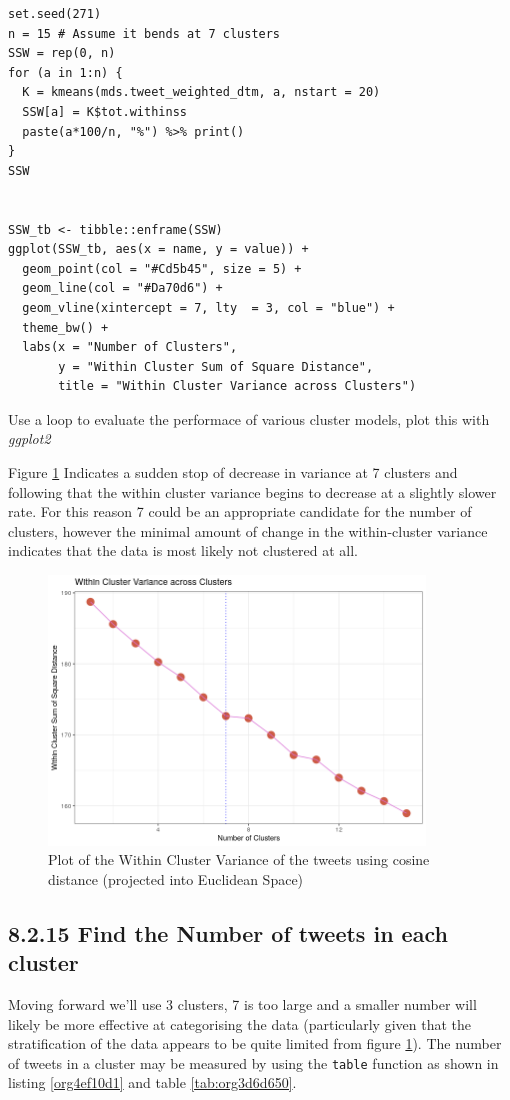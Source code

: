\documentclass[11pt]{article}
\begin{document}
\begin{listing}[htbp]
\begin{verbatim}
set.seed(271)
n = 15 # Assume it bends at 7 clusters
SSW = rep(0, n)
for (a in 1:n) {
  K = kmeans(mds.tweet_weighted_dtm, a, nstart = 20)
  SSW[a] = K$tot.withinss
  paste(a*100/n, "%") %>% print()
}
SSW


SSW_tb <- tibble::enframe(SSW)
ggplot(SSW_tb, aes(x = name, y = value)) +
  geom_point(col = "#Cd5b45", size = 5) +
  geom_line(col = "#Da70d6") +
  geom_vline(xintercept = 7, lty  = 3, col = "blue") +
  theme_bw() +
  labs(x = "Number of Clusters",
       y = "Within Cluster Sum of Square Distance",
       title = "Within Cluster Variance across Clusters")
\end{verbatim}
\caption{\label{org024fd96}Use a loop to evaluate the performace of various cluster models, plot this with \emph{ggplot2}}
\end{listing}

Figure \ref{fig:orge0b35b2} Indicates a sudden stop of decrease in variance at 7 clusters and following that the within cluster variance begins to decrease at a slightly slower rate. For this reason 7 could be an appropriate candidate for the number of clusters, however the minimal amount of change in the within-cluster variance indicates that the data is most likely not clustered at all.


\begin{figure}[htbp]
\centering
\includegraphics[width=10cm]{./Figures/Q14WithinClusterVariance.png}
\caption{\label{fig:orge0b35b2}Plot of the Within Cluster Variance of the tweets using cosine distance (projected into Euclidean Space)}
\end{figure}

\subsection{8.2.15 Find the Number of tweets in each cluster}
\label{sec:orga2548f1}
Moving forward we'll use 3 clusters, 7 is too large and a smaller number will likely be more effective at categorising the data (particularly given that the stratification of the data appears to be quite limited from figure \ref{fig:orge0b35b2}). The number of tweets in a cluster may be measured by using the \texttt{table} function as shown in listing \ref{org4ef10d1} and table \ref{tab:org3d6d650}.
\end{document}

